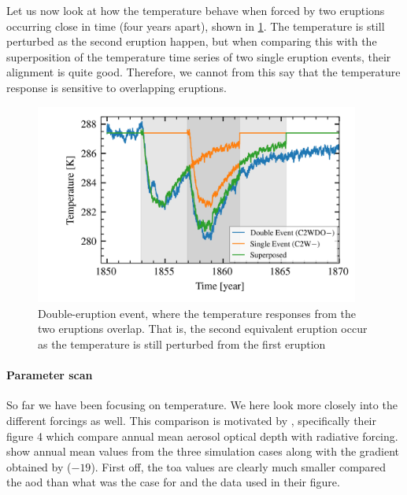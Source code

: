 \documentclass{ametsocV5}
\begin{document}
Let us now look at how the temperature behave when forced by two eruptions occurring
close in time (four years apart), shown in \cref{fig:double-overlap-superpose}. The
temperature is still perturbed as the second eruption happen, but when comparing this
with the superposition of the temperature time series of two single eruption events,
their alignment is quite good. Therefore, we cannot from this say that the temperature
response is sensitive to overlapping eruptions.

\begin{figure}
  \begin{center}
    \includegraphics[width=0.95\textwidth]{figures/double-overlap-superpose.png}
  \end{center}
  \caption{Double-eruption event, where the temperature responses from the two eruptions
    overlap. That is, the second equivalent eruption occur as the temperature is still
    perturbed from the first eruption}
  \label{fig:double-overlap-superpose}
\end{figure}

\paragraph*{Parameter scan}

So far we have been focusing on temperature. We here look more closely into the
different forcings as well. This comparison is motivated by \citet{gregory2016},
specifically their figure 4 which compare annual mean aerosol optical depth with
radiative forcing.  show annual mean values from the three
simulation cases along with the gradient obtained by \citet{gregory2016} (\(-19\)).
First off, the \acrshort{toa} values are clearly much smaller compared the
\acrshort{aod} than what was the case for \citet{gregory2016} and the data used in their
figure.
\end{document}

